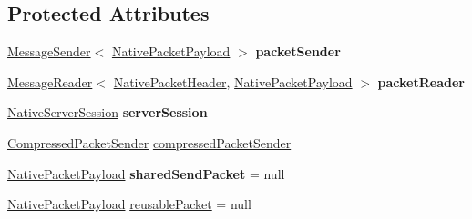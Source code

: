 \subsection*{Protected Attributes}
\begin{DoxyCompactItemize}
\item 
\mbox{\label{classcom_1_1mysql_1_1cj_1_1protocol_1_1a_1_1_native_protocol_aa922ca09ca0ae78cadca82997cf8dd2f}} 
\mbox{\hyperlink{interfacecom_1_1mysql_1_1cj_1_1protocol_1_1_message_sender}{Message\+Sender}}$<$ \mbox{\hyperlink{classcom_1_1mysql_1_1cj_1_1protocol_1_1a_1_1_native_packet_payload}{Native\+Packet\+Payload}} $>$ {\bfseries packet\+Sender}
\item 
\mbox{\label{classcom_1_1mysql_1_1cj_1_1protocol_1_1a_1_1_native_protocol_af7c9240665a625d0b23bc988f8d90090}} 
\mbox{\hyperlink{interfacecom_1_1mysql_1_1cj_1_1protocol_1_1_message_reader}{Message\+Reader}}$<$ \mbox{\hyperlink{classcom_1_1mysql_1_1cj_1_1protocol_1_1a_1_1_native_packet_header}{Native\+Packet\+Header}}, \mbox{\hyperlink{classcom_1_1mysql_1_1cj_1_1protocol_1_1a_1_1_native_packet_payload}{Native\+Packet\+Payload}} $>$ {\bfseries packet\+Reader}
\item 
\mbox{\label{classcom_1_1mysql_1_1cj_1_1protocol_1_1a_1_1_native_protocol_afc3a2eecce6580bb77f9c6564d652482}} 
\mbox{\hyperlink{classcom_1_1mysql_1_1cj_1_1protocol_1_1a_1_1_native_server_session}{Native\+Server\+Session}} {\bfseries server\+Session}
\item 
\mbox{\hyperlink{classcom_1_1mysql_1_1cj_1_1protocol_1_1a_1_1_compressed_packet_sender}{Compressed\+Packet\+Sender}} \mbox{\hyperlink{classcom_1_1mysql_1_1cj_1_1protocol_1_1a_1_1_native_protocol_a3fa25ff62eafecd246c6c47258a7ae80}{compressed\+Packet\+Sender}}
\item 
\mbox{\label{classcom_1_1mysql_1_1cj_1_1protocol_1_1a_1_1_native_protocol_a78f6d0f4e7668aad319c35d72b469dc0}} 
\mbox{\hyperlink{classcom_1_1mysql_1_1cj_1_1protocol_1_1a_1_1_native_packet_payload}{Native\+Packet\+Payload}} {\bfseries shared\+Send\+Packet} = null
\item 
\mbox{\hyperlink{classcom_1_1mysql_1_1cj_1_1protocol_1_1a_1_1_native_packet_payload}{Native\+Packet\+Payload}} \mbox{\hyperlink{classcom_1_1mysql_1_1cj_1_1protocol_1_1a_1_1_native_protocol_a3cbc16a90deb548d74da81685a49216d}{reusable\+Packet}} = null

\end{DoxyCompactItemize}
